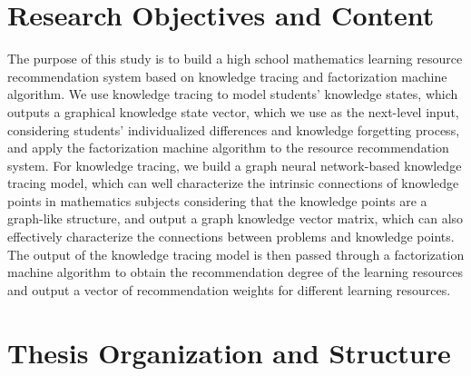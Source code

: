 \section{Research Objectives and Content}  %
The purpose of this study is to build a high school mathematics learning resource recommendation system based on knowledge tracing and factorization machine algorithm. We use knowledge tracing to model students' knowledge states, which outputs a graphical knowledge state vector, which we use as the next-level input, considering students' individualized differences and knowledge forgetting process, and apply the factorization machine algorithm to the resource recommendation system. For knowledge tracing, we build a graph neural network-based knowledge tracing model, which can well characterize the intrinsic connections of knowledge points in mathematics subjects considering that the knowledge points are a graph-like structure, and output a graph knowledge vector matrix, which can also effectively characterize the connections between problems and knowledge points. The output of the knowledge tracing model is then passed through a factorization machine algorithm to obtain the recommendation degree of the learning resources and output a vector of recommendation weights for different learning resources.

\section{Thesis Organization and Structure}


